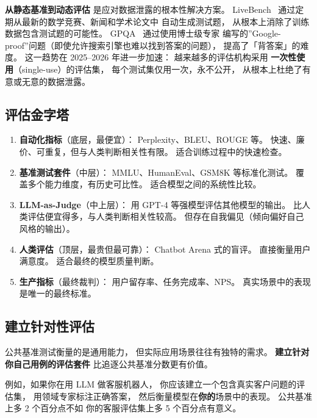 \textbf{从静态基准到动态评估}
是应对数据泄露的根本性解决方案。
LiveBench~\cite{white2024livebench}
通过定期从最新的数学竞赛、新闻和学术论文中
自动生成测试题，
从根本上消除了训练数据包含测试题的可能性。
GPQA~\cite{rein2024gpqa} 通过使用博士级专家
编写的”Google-proof”问题（即使允许搜索引擎也难以找到答案的问题），
提高了「背答案」的难度。
这一趋势在 2025--2026 年进一步加速：
越来越多的评估机构采用
\textbf{一次性使用}（single-use）的评估集，
每个测试集仅用一次，永不公开，
从根本上杜绝了有意或无意的数据泄露。

\subsection{评估金字塔}

\begin{corebox}
\begin{enumerate}[noitemsep]
  \item \textbf{自动化指标}（底层，最便宜）：
        Perplexity、BLEU、ROUGE 等。
        快速、廉价、可重复，但与人类判断相关性有限。
        适合训练过程中的快速检查。
  \item \textbf{基准测试套件}（中层）：
        MMLU、HumanEval、GSM8K 等标准化测试。
        覆盖多个能力维度，有历史可比性。
        适合模型之间的系统性比较。
  \item \textbf{LLM-as-Judge}（中上层）：
        用 GPT-4 等强模型评估其他模型的输出。
        比人类评估便宜得多，与人类判断相关性较高。
        但存在自我偏见（倾向偏好自己风格的输出）。
  \item \textbf{人类评估}（顶层，最贵但最可靠）：
        Chatbot Arena 式的盲评。
        直接衡量用户满意度。
        适合最终的模型质量判断。
  \item \textbf{生产指标}（最终裁判）：
        用户留存率、任务完成率、NPS。
        真实场景中的表现是唯一的最终标准。
\end{enumerate}
\end{corebox}

\subsection{建立针对性评估}

公共基准测试衡量的是通用能力，
但实际应用场景往往有独特的需求。
\textbf{建立针对你自己用例的评估套件}
比追逐公共基准分数更有价值。

例如，如果你在用 LLM 做客服机器人，
你应该建立一个包含真实客户问题的评估集，
用领域专家标注正确答案，
然后衡量模型在\textbf{你的}场景中的表现。
公共基准上多 2 个百分点不如
你的客服评估集上多 5 个百分点有意义。

